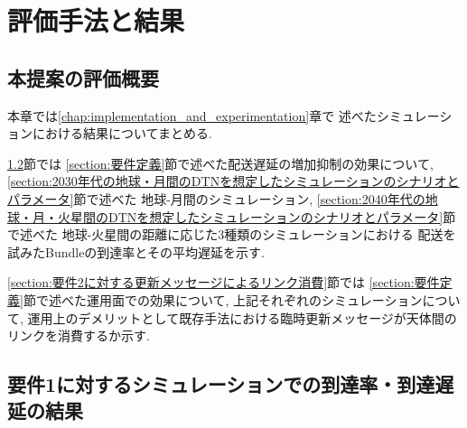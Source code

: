 \chapter{評価手法と結果}
\label{chap:evaluation}
\section{本提案の評価概要}
本章では\ref{chap:implementation_and_experimentation}章で
述べたシミュレーションにおける結果についてまとめる.

\ref{section:要件1に対するシミュレーション結果}節では
\ref{section:要件定義}節で述べた配送遅延の増加抑制の効果について, 
\ref{section:2030年代の地球・月間のDTNを想定したシミュレーションのシナリオとパラメータ}節で述べた
地球-月間のシミュレーション, 
\ref{section:2040年代の地球・月・火星間のDTNを想定したシミュレーションのシナリオとパラメータ}節で述べた
地球-火星間の距離に応じた3種類のシミュレーションにおける
配送を試みたBundleの到達率とその平均遅延を示す. 

\ref{section:要件2に対する更新メッセージによるリンク消費}節では
\ref{section:要件定義}節で述べた運用面での効果について, 
上記それぞれのシミュレーションについて, 
運用上のデメリットとして既存手法における臨時更新メッセージが天体間のリンクを消費するか示す. 

\section{要件1に対するシミュレーションでの到達率・到達遅延の結果}
\label{section:要件1に対するシミュレーション結果}

